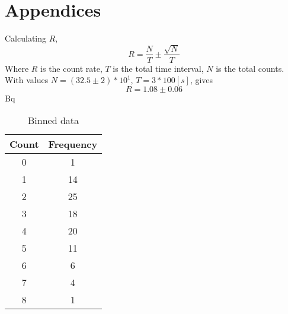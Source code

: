 \documentclass[11pt]{article}
\begin{document}
    \section{Appendices}
    Calculating $R$, $$ R = \frac{N}{T} \pm \frac{\sqrt{N}}{T}$$
    Where $R$ is the count rate, $T$ is the total time interval, $N$ is the total counts. With values $N =( 32.5 \pm 2) * 10^{1}$, $T= 3 * 100 [s]$, gives 
    $$R = 1.08 \pm 0.06$$ Bq
    \begin{table}[b]
        \centering
        \begin{tabular}{|c|c|}
        \hline
          \textbf{Count}  & \textbf{Frequency} \\
          \hline
           0  & 1 \\
           1 & 14\\
           2  & 25 \\
           3  & 18 \\
           4  & 20 \\
           5  & 11 \\
           6  & 6\\
           7  & 4 \\
           8  & 1 \\
           \hline
        \end{tabular}
        \caption{Binned data}
        \label{tab:my_label}
    \end{table}
     
\end{document}
